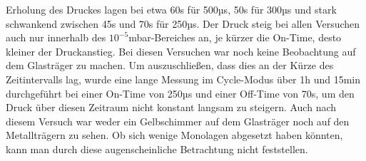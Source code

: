 Erholung des Druckes lagen bei etwa 60s für 500µs, 50s für 300µs und stark schwankend zwischen 45s
und 70s für 250µs. Der Druck steig bei allen Versuchen auch nur innerhalb des
$10^{-5}$mbar-Bereiches an, je kürzer die On-Time, desto kleiner der Druckanstieg. Bei diesen
Versuchen war noch keine Beobachtung auf dem Glasträger zu machen. Um auszuschließen, dass dies an
der Kürze des Zeitintervalls lag, wurde eine lange Messung im Cycle-Modus über 1h und 15min
durchgeführt bei einer On-Time von 250µs und einer Off-Time von 70s, um den Druck über diesen
Zeitraum nicht konstant langsam zu steigern. Auch nach diesem Versuch war weder ein Gelbschimmer
auf dem Glasträger noch auf den Metallträgern zu sehen. Ob sich wenige Monolagen abgesetzt haben könnten, kann man durch diese
augenscheinliche Betrachtung nicht feststellen.\\
































